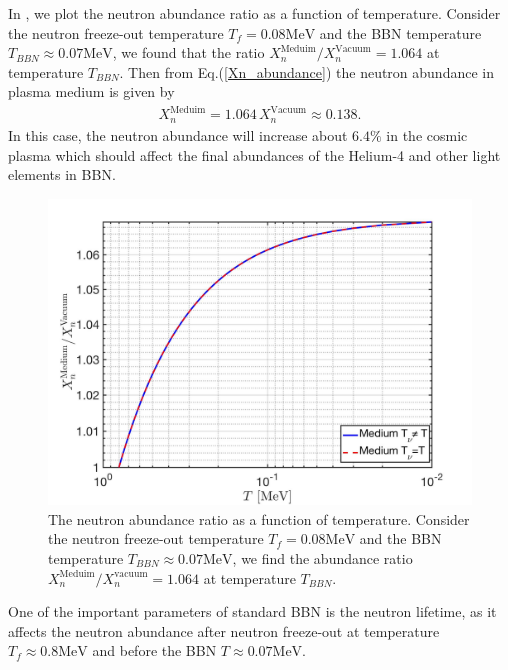 In  , we plot the neutron abundance ratio as a function of temperature. Consider the neutron freeze-out temperature $T_f=0.08\mathrm{MeV}$ and the BBN temperature $T_{BBN}\approx0.07\mathrm{MeV}$, we found that the ratio ${X_n^{\mathrm{Meduim}}}/{X_n^{\mathrm{Vacuum}}}=1.064$ at temperature $T_{BBN}$. Then from Eq.(\ref{Xn_abundance}) the neutron abundance in plasma medium is given by
\begin{align}
X_n^{\mathrm{Meduim}}=1.064\,X_n^{\mathrm{Vacuum}}\approx0.138.
\end{align}
In this case, the neutron abundance will increase about $6.4\%$ in the cosmic plasma which should affect the final abundances of the Helium-4 and other light elements in BBN.
 
\begin{figure} 
\centerline{\includegraphics[width=0.9\linewidth]{./plots/Neutron_Abundance}}
\caption{The neutron abundance ratio as a function of temperature. Consider the neutron freeze-out temperature $T_f=0.08\mathrm{MeV}$ and the BBN temperature $T_{BBN}\approx0.07\mathrm{MeV}$, we find the abundance ratio ${X_n^{\mathrm{Meduim}}}/{X_n^{\mathrm{vacuum}}}=1.064$ at temperature $T_{BBN}$.}%
\label{Neutron:Abundance} 
\end{figure}

One of the important parameters of standard BBN is the neutron lifetime, as it affects the neutron abundance after neutron freeze-out at temperature $T_f\approx 0.8 \mathrm{MeV}$ and before the BBN $T\approx0.07 \mathrm{MeV}$. 

